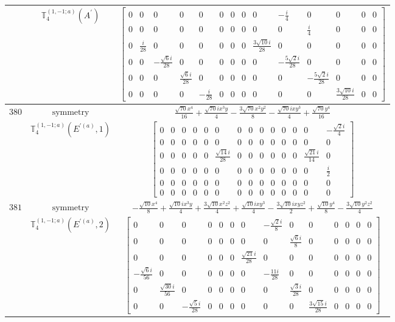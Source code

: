 \documentclass[fleqn,8pt,landscape]{jsarticle}
\begin{document}
\begin{longtable}{ccc}
$  $ & $ \mathbb{T}_{4}^{(1,-1;a)}(A^{\prime}) $ & $ \begin{bmatrix} 0 & 0 & 0 & 0 & 0 & 0 & 0 & 0 & 0 & - \frac{i}{4} & 0 & 0 & 0 & 0 \\ 0 & 0 & 0 & 0 & 0 & 0 & 0 & 0 & 0 & 0 & \frac{i}{4} & 0 & 0 & 0 \\ 0 & \frac{i}{28} & 0 & 0 & 0 & 0 & 0 & 0 & \frac{3 \sqrt{10} i}{28} & 0 & 0 & 0 & 0 & 0 \\ 0 & 0 & - \frac{\sqrt{6} i}{28} & 0 & 0 & 0 & 0 & 0 & 0 & - \frac{5 \sqrt{2} i}{28} & 0 & 0 & 0 & 0 \\ 0 & 0 & 0 & \frac{\sqrt{6} i}{28} & 0 & 0 & 0 & 0 & 0 & 0 & - \frac{5 \sqrt{2} i}{28} & 0 & 0 & 0 \\ 0 & 0 & 0 & 0 & - \frac{i}{28} & 0 & 0 & 0 & 0 & 0 & 0 & \frac{3 \sqrt{10} i}{28} & 0 & 0 \end{bmatrix} $ \\ \hline
$ 380 $ & $ \text{symmetry} $ & $ \frac{\sqrt{70} x^{4}}{16} + \frac{\sqrt{70} i x^{3} y}{4} - \frac{3 \sqrt{70} x^{2} y^{2}}{8} - \frac{\sqrt{70} i x y^{3}}{4} + \frac{\sqrt{70} y^{4}}{16} $ \\
$  $ & $ \mathbb{T}_{4}^{(1,-1;a)}(E^{\prime(a)},1) $ & $ \begin{bmatrix} 0 & 0 & 0 & 0 & 0 & 0 & 0 & 0 & 0 & 0 & 0 & 0 & 0 & - \frac{\sqrt{2} i}{4} \\ 0 & 0 & 0 & 0 & 0 & 0 & 0 & 0 & 0 & 0 & 0 & 0 & 0 & 0 \\ 0 & 0 & 0 & 0 & 0 & \frac{\sqrt{14} i}{28} & 0 & 0 & 0 & 0 & 0 & 0 & \frac{\sqrt{21} i}{14} & 0 \\ 0 & 0 & 0 & 0 & 0 & 0 & 0 & 0 & 0 & 0 & 0 & 0 & 0 & \frac{i}{2} \\ 0 & 0 & 0 & 0 & 0 & 0 & 0 & 0 & 0 & 0 & 0 & 0 & 0 & 0 \\ 0 & 0 & 0 & 0 & 0 & 0 & 0 & 0 & 0 & 0 & 0 & 0 & 0 & 0 \end{bmatrix} $ \\ \hline
$ 381 $ & $ \text{symmetry} $ & $ - \frac{\sqrt{10} x^{4}}{8} + \frac{\sqrt{10} i x^{3} y}{4} + \frac{3 \sqrt{10} x^{2} z^{2}}{4} + \frac{\sqrt{10} i x y^{3}}{4} - \frac{3 \sqrt{10} i x y z^{2}}{2} + \frac{\sqrt{10} y^{4}}{8} - \frac{3 \sqrt{10} y^{2} z^{2}}{4} $ \\
$  $ & $ \mathbb{T}_{4}^{(1,-1;a)}(E^{\prime(a)},2) $ & $ \begin{bmatrix} 0 & 0 & 0 & 0 & 0 & 0 & 0 & - \frac{\sqrt{2} i}{8} & 0 & 0 & 0 & 0 & 0 & 0 \\ 0 & 0 & 0 & 0 & 0 & 0 & 0 & 0 & \frac{\sqrt{6} i}{8} & 0 & 0 & 0 & 0 & 0 \\ 0 & 0 & 0 & 0 & 0 & 0 & \frac{\sqrt{21} i}{28} & 0 & 0 & 0 & 0 & 0 & 0 & 0 \\ - \frac{\sqrt{6} i}{56} & 0 & 0 & 0 & 0 & 0 & 0 & - \frac{11 i}{28} & 0 & 0 & 0 & 0 & 0 & 0 \\ 0 & \frac{\sqrt{30} i}{56} & 0 & 0 & 0 & 0 & 0 & 0 & \frac{\sqrt{3} i}{28} & 0 & 0 & 0 & 0 & 0 \\ 0 & 0 & - \frac{\sqrt{5} i}{28} & 0 & 0 & 0 & 0 & 0 & 0 & \frac{3 \sqrt{15} i}{28} & 0 & 0 & 0 & 0 \end{bmatrix} $ \\ \hline

\end{longtable}
\end{document}
